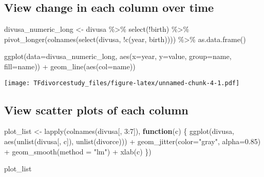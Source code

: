 \documentclass[
]{article}
\newenvironment{Shaded}{\begin{snugshade}}{\end{snugshade}}
\newcommand{\AttributeTok}[1]{\textcolor[rgb]{0.77,0.63,0.00}{#1}}
\newcommand{\ControlFlowTok}[1]{\textcolor[rgb]{0.13,0.29,0.53}{\textbf{#1}}}
\newcommand{\DecValTok}[1]{\textcolor[rgb]{0.00,0.00,0.81}{#1}}
\newcommand{\FloatTok}[1]{\textcolor[rgb]{0.00,0.00,0.81}{#1}}
\newcommand{\FunctionTok}[1]{\textcolor[rgb]{0.00,0.00,0.00}{#1}}
\newcommand{\NormalTok}[1]{#1}
\newcommand{\OtherTok}[1]{\textcolor[rgb]{0.56,0.35,0.01}{#1}}
\newcommand{\SpecialCharTok}[1]{\textcolor[rgb]{0.00,0.00,0.00}{#1}}
\newcommand{\StringTok}[1]{\textcolor[rgb]{0.31,0.60,0.02}{#1}}
\begin{document}
\hypertarget{view-change-in-each-column-over-time}{%
\subsection{View change in each column over
time}\label{view-change-in-each-column-over-time}}

\begin{Shaded}
\begin{Highlighting}[]
\NormalTok{divusa\_numeric\_long }\OtherTok{\textless{}{-}}\NormalTok{ divusa }\SpecialCharTok{\%\textgreater{}\%} \FunctionTok{select}\NormalTok{(}\SpecialCharTok{!}\NormalTok{birth) }\SpecialCharTok{\%\textgreater{}\%} \FunctionTok{pivot\_longer}\NormalTok{(}\FunctionTok{colnames}\NormalTok{(}\FunctionTok{select}\NormalTok{(divusa, }\SpecialCharTok{!}\FunctionTok{c}\NormalTok{(year, birth)))) }\SpecialCharTok{\%\textgreater{}\%} \FunctionTok{as.data.frame}\NormalTok{()}

\FunctionTok{ggplot}\NormalTok{(}\AttributeTok{data=}\NormalTok{divusa\_numeric\_long, }\FunctionTok{aes}\NormalTok{(}\AttributeTok{x=}\NormalTok{year, }\AttributeTok{y=}\NormalTok{value, }\AttributeTok{group=}\NormalTok{name, }\AttributeTok{fill=}\NormalTok{name)) }\SpecialCharTok{+} \FunctionTok{geom\_line}\NormalTok{(}\FunctionTok{aes}\NormalTok{(}\AttributeTok{col=}\NormalTok{name))}
\end{Highlighting}
\end{Shaded}

\texttt{[image: TFdivorcestudy\_files/figure-latex/unnamed-chunk-4-1.pdf]}

\hypertarget{view-scatter-plots-of-each-column}{%
\subsection{View scatter plots of each
column}\label{view-scatter-plots-of-each-column}}

\begin{Shaded}
\begin{Highlighting}[]
\NormalTok{plot\_list }\OtherTok{\textless{}{-}} \FunctionTok{lapply}\NormalTok{(}\FunctionTok{colnames}\NormalTok{(divusa[, }\DecValTok{3}\SpecialCharTok{:}\DecValTok{7}\NormalTok{]), }\ControlFlowTok{function}\NormalTok{(c) \{}
  \FunctionTok{ggplot}\NormalTok{(divusa, }\FunctionTok{aes}\NormalTok{(}\FunctionTok{unlist}\NormalTok{(divusa[, c]), }\FunctionTok{unlist}\NormalTok{(divorce))) }\SpecialCharTok{+} 
    \FunctionTok{geom\_jitter}\NormalTok{(}\AttributeTok{color=}\StringTok{"gray"}\NormalTok{, }\AttributeTok{alpha=}\FloatTok{0.85}\NormalTok{) }\SpecialCharTok{+} 
    \FunctionTok{geom\_smooth}\NormalTok{(}\AttributeTok{method =} \StringTok{"lm"}\NormalTok{) }\SpecialCharTok{+} \FunctionTok{xlab}\NormalTok{(c)}
\NormalTok{ \}) }


\NormalTok{plot\_list}
\end{Highlighting}
\end{Shaded}
\end{document}
